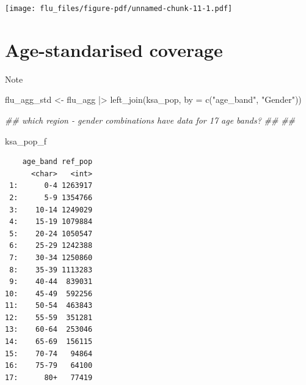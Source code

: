 \documentclass[
  letterpaper,
  DIV=11,
  numbers=noendperiod]{scrreprt}
\newenvironment{Shaded}{\begin{snugshade}}{\end{snugshade}}
\newcommand{\AttributeTok}[1]{\textcolor[rgb]{0.40,0.45,0.13}{#1}}
\newcommand{\DocumentationTok}[1]{\textcolor[rgb]{0.37,0.37,0.37}{\textit{#1}}}
\newcommand{\FunctionTok}[1]{\textcolor[rgb]{0.28,0.35,0.67}{#1}}
\newcommand{\NormalTok}[1]{\textcolor[rgb]{0.00,0.23,0.31}{#1}}
\newcommand{\OtherTok}[1]{\textcolor[rgb]{0.00,0.23,0.31}{#1}}
\newcommand{\SpecialCharTok}[1]{\textcolor[rgb]{0.37,0.37,0.37}{#1}}
\newcommand{\StringTok}[1]{\textcolor[rgb]{0.13,0.47,0.30}{#1}}
\begin{document}
\texttt{[image: flu\_files/figure-pdf/unnamed-chunk-11-1.pdf]}

\section{Age-standarised coverage}\label{age-standarised-coverage}

Note

\begin{Shaded}
\begin{Highlighting}[]
\NormalTok{flu\_agg\_std }\OtherTok{\textless{}{-}}\NormalTok{ flu\_agg }\SpecialCharTok{|\textgreater{}}
    \FunctionTok{left\_join}\NormalTok{(ksa\_pop, }\AttributeTok{by =} \FunctionTok{c}\NormalTok{(}\StringTok{"age\_band"}\NormalTok{, }\StringTok{"Gender"}\NormalTok{))}

\DocumentationTok{\#\# which region {-} gender combinations have data for 17 age bands?}
\DocumentationTok{\#\# }
\DocumentationTok{\#\# }

\NormalTok{ksa\_pop\_f}
\end{Highlighting}
\end{Shaded}

\begin{verbatim}
    age_band ref_pop
      <char>   <int>
 1:      0-4 1263917
 2:      5-9 1354766
 3:    10-14 1249029
 4:    15-19 1079884
 5:    20-24 1050547
 6:    25-29 1242388
 7:    30-34 1250860
 8:    35-39 1113283
 9:    40-44  839031
10:    45-49  592256
11:    50-54  463843
12:    55-59  351281
13:    60-64  253046
14:    65-69  156115
15:    70-74   94864
16:    75-79   64100
17:      80+   77419
\end{verbatim}
\end{document}
